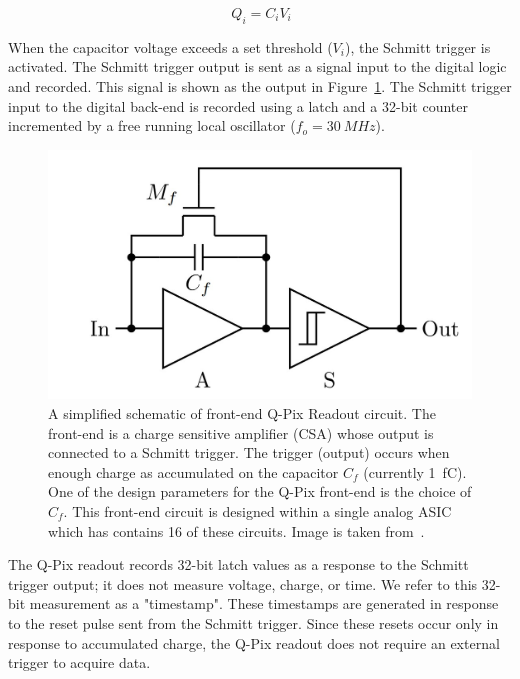\begin{equation}~\label{eq:capacitor}
Q_{i} = C_{i}V_{i}
\end{equation}

When the capacitor voltage exceeds a set threshold ($V_{i}$), the Schmitt trigger is activated.
The Schmitt trigger output is sent as a signal input to the digital logic and recorded.
This signal is shown as the output in Figure~\ref{fig:qpixCircuit}.
The Schmitt trigger input to the digital back-end is recorded using a latch and a 32-bit counter incremented by a free running local oscillator ($f_{o} = 30~\unit{MHz}$).

\begin{figure}[]
\centering
\includegraphics[width=\textwidth]{images/qpix_circuit.jpg}
\caption{A simplified schematic of front-end Q-Pix Readout circuit.
The front-end is a charge sensitive amplifier (CSA) whose output is connected to a Schmitt trigger.
The trigger (output) occurs when enough charge as accumulated on the capacitor $C_{f}$ (currently 1~\unit{fC}).
One of the design parameters for the Q-Pix front-end is the choice of $C_{f}$.
This front-end circuit is designed within a single analog ASIC which has contains 16 of these circuits.
Image is taken from~\citep{qpix:nygren:mei}.}
\label{fig:qpixCircuit}
\end{figure}

The Q-Pix readout records 32-bit latch values as a response to the Schmitt trigger output; it does not measure voltage, charge, or time.
We refer to this 32-bit measurement as a "timestamp".
These timestamps are generated in response to the reset pulse sent from the Schmitt trigger.
Since these resets occur only in response to accumulated charge, the Q-Pix readout does not require an external trigger to acquire data.

